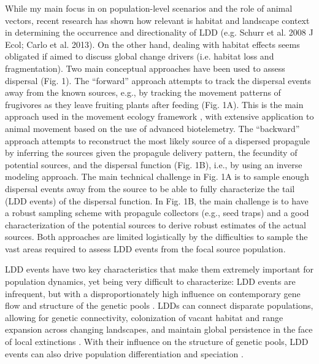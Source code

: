 \documentclass[a4paper, 12pt]{article}
\begin{document}
\begin{linenumbers}
While my main focus in on population-level scenarios and the role of animal vectors, recent research has shown how relevant is habitat and landscape context in determining the occurrence and directionality of LDD (e.g. Schurr et al. 2008 J Ecol; Carlo et al. 2013). On the other hand, dealing with habitat effects seems obligated if aimed to discuss global change drivers (i.e. habitat loss and fragmentation). Two main conceptual approaches have been used to assess dispersal (Fig. 1). The “forward” approach attempts to track the dispersal events away from the known sources, e.g., by tracking the movement patterns of frugivores as they leave fruiting plants after feeding (Fig. 1A). This is the main approach used in the movement ecology framework \citep{Nathan:2008fx}, with extensive application to animal movement based on the use of advanced biotelemetry. The “backward” approach attempts to reconstruct the most likely source of a dispersed propagule by inferring the sources given the propagule delivery pattern, the fecundity of potential sources, and the dispersal function (Fig. 1B), i.e., by using an inverse modeling approach. The main technical challenge in Fig. 1A is to sample enough dispersal events away from the source to be able to fully characterize the tail (LDD events) of the dispersal function. In Fig. 1B, the main challenge is to have a robust sampling scheme with propagule collectors (e.g., seed traps) and a good characterization of the potential sources to derive robust estimates of the actual sources. Both approaches are limited logistically by the difficulties to sample the vast areas required to assess LDD events from the focal source population.   

LDD events have two key characteristics that make them extremely important for population dynamics, yet being very difficult to characterize: LDD events are infrequent, but with a disproportionately high influence on contemporary gene flow and structure of the genetic pools \citep[e.g., ][]{Schurr2009long,Clobert:2012vw,Travis:2013en}. LDDs can connect disparate populations, allowing for genetic connectivity, colonization of vacant habitat and range expansion across changing landscapes, and maintain global persistence in the face of local extinctions \citep{Trakhtenbrot:2005ij,Baguette:2006aa,Ronce:2007hc,Schloss:2012gt}. With their influence on the structure of genetic pools, LDD events can also drive population differentiation and speciation \citep{Ronce:2007hc}.


\end{linenumbers}
\end{document}
